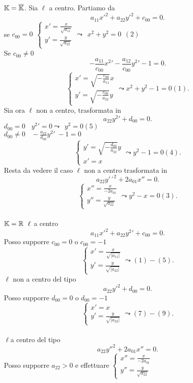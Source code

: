 \documentclass[12px]{article}
\begin{document}
\begin{dimo}
		$\mathbb{K} = \overline {\mathbb{K}}$. Sia  $\ell$ a centro. Partiamo da 
		\[
		 a_{11}x'^2 + a_{22}y'^2 + c_{00} =0
		.\] 
		se $c_{00} = 0 \ \ \begin{cases}
			x' = \frac {x} {\sqrt {a_{11}}}\\
			y'  = \frac y {\sqrt{a_{22}}}
		\end{cases} \leadsto \ \ x^2 + y^2 = 0 \ \ (2)$ \\
		Se $c_{00} \neq 0$
		\[
			-\frac {a_{11}}{c_{00}}x^2 ' - \frac{a_{12}}{c_{00}}y^2 ' - 1 = 0
		.\] 
		\[
		 \begin{cases}
			 x' = \sqrt{-\frac {c_{00}}{a_{11}}}x\\
			 y'= \sqrt{-\frac{c_{00}}{a_{22}}}y
		 \end{cases} \leadsto x^2 + y^2 -1 = 0(1)
		.\] 
		Sia ora $\ell$ non a centro, trasformata in 
		\[
		 a_{22} y^2 ' + d_{00} = 0
		.\] 
		$d_{00} =0  \ \ \ \ y^2 ' =0 \leadsto \ \ y^2 =0 (5)$\\
	$d_{00}\neq 0 \ \ \ \ -\frac {a_{22}}{d_{00}}y^2' \ - 1 =0 $
	\[
	 \begin{cases}
		 y'= \sqrt{-\frac{d_{00}}{a_{22}}}y\\
		 x' = x
	 \end{cases} \leadsto y^2 - 1 = 0 (4)
	.\]
	Resta da vedere il caso $\ell $ non a centro trasformata in 
	\[
	 a_{22} y'´ ^2 + 2a_{01}x''= 0
	.\] 
	\[
	 \begin{cases}
		 x''= \frac x {-2a_{01}}\\
		 y'' = \frac y {\sqrt{a_{22}}}
	 \end{cases}\leadsto y^2-x = 0 (3)
	.\] \\
	$\mathbb{K} = \mathbb{R} \ \ \ell $  a centro\\
	\[
	 a_{11} x'^2 + a_{22}y^2 ' + c_{00} =0 
	.\] 
	Posso supporre $c_00 =0 $ o $c_00 = -1$\\
	\[
	 \begin{cases}
		 x'= \frac x {\sqrt{|a_{11}|}}\\
		 y' = \frac y {\sqrt{|a_{22}|}}
	 \end{cases}\leadsto (1)-(5)
	.\] 
	$\ell$ non a centro del tipo
	\[
	a_{22}y'^2 + d_00 = 0
	.\] 
	Posso supporre $d_{00} = 0$ o $d_{00} = -1$\\
	\[
	\begin{cases}
		x' = x\\
		y' = \frac y {\sqrt{|a_{22}|}}
	\end{cases} \leadsto (7) - (9)
	.\] \\
	$\ell $a centro del tipo 
	\[
		a_{22} y''^2 + 2a_{01}x'' = 0
	.\] 
	Posso supporre $a_{22} >0$ e effettuare $ \begin{cases}
		x'' = \frac x {-2 a_{01}}\\
		y'' = \frac y {\sqrt{a_{22}}}
	\end{cases}$ 
	\end{dimo}
\end{document}
